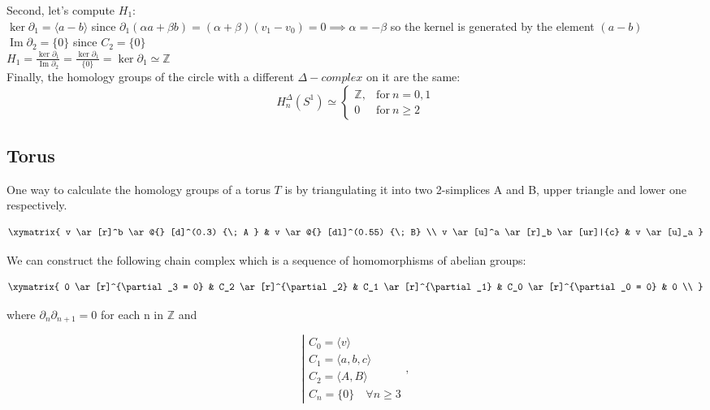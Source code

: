 \documentclass[11pt,a4paper]{report}
\DeclareMathOperator{\Ima}{Im}
\begin{document}
\par
Second, let's compute $H_1$: \\
$\ker\partial_1 = \langle a-b \rangle$
		since $\partial_1(\alpha a + \beta b) = (\alpha + \beta)(v_1 - v_0) = 0 \implies \alpha = -\beta$ so the kernel is generated by the element $(a - b)$ \\
$\Ima\partial_2 = \{0\}$ since $C_2 = \{0\}$ \\
$H_1 = \frac{\ker\partial_1}{\Ima\partial_2} =
		\frac{ \ker{\partial_1} }{ \{0\} } = \ker{\partial_1} \simeq \mathbb{Z}$ \\


Finally, the homology groups of the circle with a different $\Delta- complex$ on it are the same:
		\[
	  		H_n^\Delta(S^1) \simeq \left\{
			      \begin{array}{rl}
			     \mathbb{Z}, & \textrm{for} \: n = 0, 1\\

                        0 & \textrm{for} \: n \geqslant 2
			      \end{array}
			 \right.
	  	\]



		      \subsection{Torus}

One way to calculate the homology groups of a torus $T$ is by triangulating it into two 2-simplices A and B, upper triangle and lower one respectively.

	\[
		\xymatrix{
			v  \ar[r]^b \ar @{} [d]^(0.3) {\; A }
			& v \ar @{} [dl]^(0.55) {\; B} \\
			v \ar[u]^a \ar[r]_b \ar[ur]|{c}
			& v \ar[u]_a }
	\]

 We can construct the following chain complex which is a sequence of homomorphisms of abelian groups:

	\[
		\xymatrix{
			0  \ar[r]^{\partial_3 = 0} &
			C_2  \ar[r]^{\partial_2} &
			C_1  \ar[r]^{\partial_1} &
			C_0  \ar[r]^{\partial_0 = 0}
			& 0 \\ }
	\]

 where \(\partial_n\partial_{n+1}=0\) for each n  in $\mathbb{Z}$ and

			\[
				\left|
				  \begin{array}{l}
				  	C_0= \langle v\rangle \\
				  	C_1=\langle a, b, c \rangle \\
                                C_2=\langle A, B \rangle \\
				      C_n=\{0\} \quad \forall n \geqslant 3
				  \end{array}
				\right.,
			\]
\end{document}
